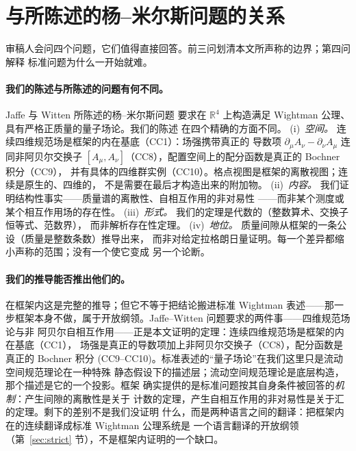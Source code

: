 \documentclass[aps,prd,preprint,superscriptaddress,amsmath,amssymb]{revtex4-2}
\begin{document}
\section{与所陈述的杨--米尔斯问题的关系}
\label{sec:relation}

审稿人会问四个问题，它们值得直接回答。前三问划清本文所声称的边界；第四问解释
标准问题为什么一开始就难。

\paragraph{我们的陈述与所陈述的问题有何不同。}
Jaffe 与 Witten 所陈述的杨--米尔斯问题 \cite{jaffe2000yang} 要求在
$\mathbb{R}^4$ 上构造满足 Wightman 公理、具有严格正质量的量子场论。我们的陈述
在四个精确的方面不同。
(i)~\emph{空间。} 连续四维规范场是框架的内在基底（CC1）：场强携带真正的
导数项 $\partial_\mu A_\nu-\partial_\nu A_\mu$ 连同非阿贝尔交换子
$[A_\mu,A_\nu]$（CC8），配置空间上的配分函数是真正的 Bochner 积分（CC9），
并有具体的四维群实例（CC10）。格点视图是框架的离散视图；连续是原生的、四维的，
不是需要在最后才构造出来的附加物。
(ii)~\emph{内容。} 我们证明结构性事实——质量谱的离散性、自相互作用的非对易性
——而非某个测度或某个相互作用场的存在性。
(iii)~\emph{形式。} 我们的定理是代数的（整数算术、交换子恒等式、范数界），
而非解析存在性定理。
(iv)~\emph{地位。} 质量间隙从框架的一条公设（质量是整数条数）推导出来，
而非对给定拉格朗日量证明。每一个差异都缩小声称的范围；没有一个使它变成
另一个论断。

\paragraph{我们的推导能否推出他们的。}
在框架内这是完整的推导；但它不等于把结论搬进标准 Wightman 表述——那一步框架本身不做，属于开放纲领。Jaffe--Witten 问题要求的两件事——四维规范场论与非
阿贝尔自相互作用——正是本文证明的定理：连续四维规范场是框架的内在基底（CC1），
场强是真正的导数项加上非阿贝尔交换子（CC8），配分函数是真正的 Bochner 积分
(CC9--CC10)。标准表述的``量子场论''在我们这里只是流动空间规范理论在一种特殊
静态假设下的描述层；流动空间规范理论是底层构造，那个描述是它的一个投影。框架
确实提供的是标准问题按其自身条件被回答的\emph{机制}：产生间隙的离散性是关于
计数的定理，产生自相互作用的非对易性是关于汇的定理。剩下的差别不是我们没证明
什么，而是两种语言之间的翻译：把框架内在的连续翻译成标准 Wightman 公理系统是
一个语言翻译的开放纲领（第~\ref{sec:strict} 节），不是框架内证明的一个缺口。
\end{document}
